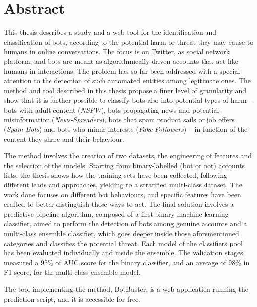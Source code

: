 
\newpage
\chapter*{Abstract}


This thesis describes a study and a web tool for the identification and classification of bots, according to the potential harm or threat they may cause to humans in online conversations. The focus is on Twitter, as social network platform, and bots are meant as algorithmically driven accounts that act like humans in interactions.
The problem has so far been addressed with a special attention to the detection of such automated entities among legitimate ones. The method and tool described in this thesis propose a finer level of granularity and show that it is further possible to classify bots also into potential types of harm --  bots with adult content (\textit{NSFW}), bots propagating news and potential misinformation (\textit{News-Spreaders}), bots that spam product sails or job offers (\textit{Spam-Bots}) and bots who mimic interests (\textit{Fake-Followers}) -- in function of the content they share and their behaviour.

The method involves the creation of two datasets, the engineering of features and the selection of the models.
Starting from binary-labelled (bot or not) accounts lists, the thesis shows how the training sets have been collected, following different leads and approaches, yielding to a stratified multi-class dataset.
The work done focuses on different bot behaviours, and specific features have been crafted to better distinguish those ways to act.
The final solution involves a predictive pipeline algorithm, composed of a first binary machine learning classifier, aimed to perform the detection of bots among genuine accounts and a multi-class ensemble classifier, which goes deeper inside those aforementioned categories and classifies the potential threat.
Each model of the classifiers pool has been evaluated individually and inside the ensemble. The validation stages measured a 95\% of AUC score for the binary classifier, and an average of 98\% in F1 score, for the multi-class ensemble model.

The tool implementing the method, BotBuster, is a web application running the prediction script, and it is accessible for free.



